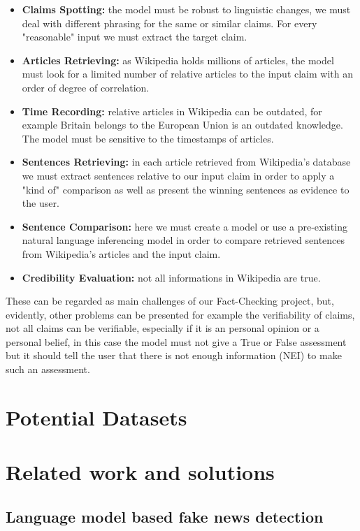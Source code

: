 \documentclass[10pt, english]{report}
\begin{document}
\begin{itemize}
	\item \textbf{Claims Spotting:} the model must be robust to linguistic changes, we must deal with different phrasing for the same or similar claims. For every "reasonable" input we must extract the target claim.
	\item \textbf{Articles Retrieving:} as Wikipedia holds millions of articles, the model must look for a limited number of relative articles to the input claim with an order of degree of correlation.
	\item \textbf{Time Recording:} relative articles in Wikipedia can be outdated, for example Britain belongs to the European Union is an outdated knowledge. The model must be sensitive to the timestamps of articles.
	\item \textbf{Sentences Retrieving:}  in each article retrieved from Wikipedia's database we must extract sentences relative to our input claim in order to apply a "kind of" comparison as well as present the winning sentences as evidence to the user.
	\item \textbf{Sentence Comparison:} here we must create a model or use a pre-existing natural language inferencing model in order to compare retrieved sentences from Wikipedia's articles and the input claim. 
	\item \textbf{Credibility Evaluation:} not all informations in Wikipedia are true.
\end{itemize}

These can be regarded as main challenges of our Fact-Checking project, but, evidently, other problems can be presented for example the verifiability of claims, not all claims can be verifiable, especially if it is an personal opinion or a personal belief, in this case the model must not give a True or False assessment but it should tell the user that there is not enough information (NEI) to make such an assessment.

\section{Potential Datasets}


\section{Related work and solutions}
\subsection{Language model based fake news detection \cite{lee2020language}}
\end{document}
